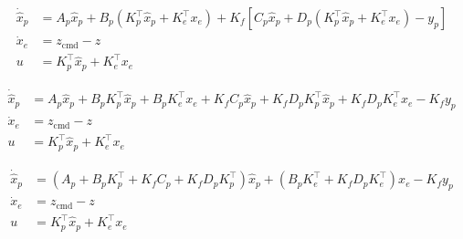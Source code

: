 \begin{equation*}
  \begin{split}
    \dot{\hat{x}}_{p}&=A_{p}\hat{x}_{p}+B_{p}(K_{p}^{\top}\hat{x}_{p}+K_{e}^{\top}x_{e})+K_{f}[C_{p}\hat{x}_{p}+D_{p}(K_{p}^{\top}\hat{x}_{p}+K_{e}^{\top}x_{e})-y_{p}] \\
    \dot{x}_{e}&=z_{\text{cmd}}-z \\
    u&=K_{p}^{\top}\hat{x}_{p}+K_{e}^{\top}x_{e}
  \end{split}
\end{equation*}

\begin{equation*}
  \begin{split}
    \dot{\hat{x}}_{p}&=A_{p}\hat{x}_{p}+B_{p}K_{p}^{\top}\hat{x}_{p}+B_{p}K_{e}^{\top}x_{e}
    +K_{f}C_{p}\hat{x}_{p}+K_{f}D_{p}K_{p}^{\top}\hat{x}_{p}+K_{f}D_{p}K_{e}^{\top}x_{e}-K_{f}y_{p} \\
    \dot{x}_{e}&=z_{\text{cmd}}-z \\
    u&=K_{p}^{\top}\hat{x}_{p}+K_{e}^{\top}x_{e}
  \end{split}
\end{equation*}

\begin{equation*}
  \begin{split}
    \dot{\hat{x}}_{p}&=(A_{p}+B_{p}K_{p}^{\top}+K_{f}C_{p}+K_{f}D_{p}K_{p}^{\top})\hat{x}_{p}+(B_{p}K_{e}^{\top}+K_{f}D_{p}K_{e}^{\top})x_{e}-K_{f}y_{p} \\
    \dot{x}_{e}&=z_{\text{cmd}}-z \\
    u&=K_{p}^{\top}\hat{x}_{p}+K_{e}^{\top}x_{e}
  \end{split}
\end{equation*}

